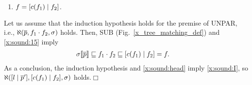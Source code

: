 \begin{enumerate}
\begin{enumerate}
         \item \label{x:sound:15} \(f = \cons{c(f_1)}{f_2}\).
       
       \end{enumerate}
       Let us assume that the induction hypothesis holds for the
       premise of \textsf{UNPAR}, i.e., \(\ind{R}(\overline{p}, f_1
       \cdot f_2, \sigma)\) holds. Then, \textsf{SUB}
       (Fig.~\ref{x_tree_matching_def}) and \ref{x:sound:15} imply
       \begin{align}
         \subst{\overline{p}}{\sigma} &\sqsubseteq f_1 \cdot f_2
          \sqsubseteq \cons{c(f_1)}{f_2} = f.
          \label{x:sound:I}
       \end{align}
        As a conclusion, the induction hypothesis and
        \eqref{x:sound:head} imply \eqref{x:sound:I}, so
        \(\ind{R}(\cons{l}{\overline{p}'}, \cons{c(f_1)}{f_2},
        \sigma)\) holds.\hfill \(\Box\)

\end{enumerate}
